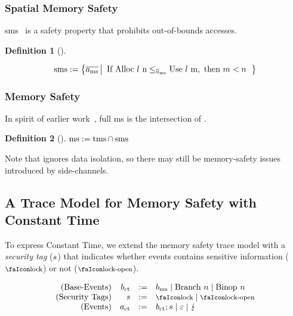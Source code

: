 \documentclass[dvipsnames,conference]{IEEEtran}
\theoremstyle{definition}
\newtheorem{definition}{Definition}[section]
\begin{document}
\subsubsection{Spatial Memory Safety}

\gls*{sms}~\cite{nagarakatte2009soft} is a safety property that prohibits out-of-bounds accesses.

\begin{definition}[]\label{def:trace:smsdef}

  \noindent
  \[
  \smssafe:=\left\{\trace[_{\mssafe}] \left|\begin{array}{rcl}
      \text{If }\ev{Alloc\ \loc\ n}\le_{\trace_{\mssafe}}\ev{Use\ \loc\ m}, \text{ then }m<n
  \end{array}\right.\right\}
  \]
\end{definition}

\subsubsection{Memory Safety}

In spirit of earlier work~\cite{nagarakatte2009soft,nagarakatte2010cets,jim2002cyclone,necula2005ccured,michael2023mswasm}, full \gls*{ms} is the intersection of .

\begin{definition}[]\label{def:trace:msdef}
  $
  \operatorname{ms}:=\operatorname{tms} \cap \operatorname{sms}
  $
\end{definition}

Note that  ignores data isolation, so there may still be memory-safety issues introduced by side-channels.

\subsection{A Trace Model for Memory Safety with Constant Time}\label{subsec:scct:tracemodel}

To express Constant Time, we extend the memory safety trace model with a {\em security tag} ($s{}$) that indicates whether events contains sensitive information ($\lock$) or not ($\unlock$).

\vspace{-.5em}
\[
  \begin{array}{rrcl}
    (\text{Base-Events}) & \preevent[_{\ctsafe}] &:=& \preevent[_{\mssafe}] \mid \ev{Branch\ }n \mid \ev{Binop\ }n\\
    (\text{Security Tags}) & \securitytag{} &:=& \lock \mid \unlock\\ 
    (\text{Events}) & \event[_{\ctsafe}] &:=& \preevent[_{\ctsafe}];\securitytag{} \mid \emptyevent \mid \lightning \\ 
  \end{array}
\]
\end{document}
